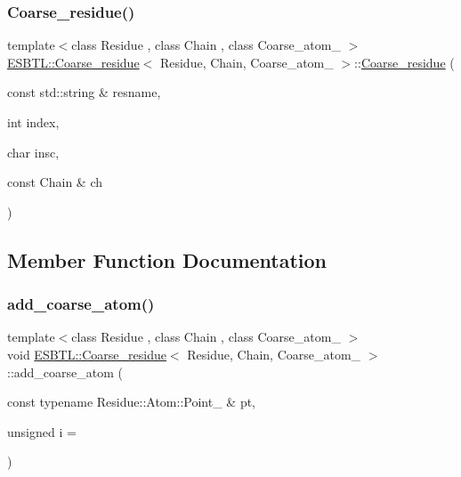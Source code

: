 \mbox{\label{classESBTL_1_1Coarse__residue_abde8049914cf69701dbe59f860887bab}} 
\subsubsection{\texorpdfstring{Coarse\+\_\+residue()}{Coarse\_residue()}\hspace{0.1cm}{\footnotesize\ttfamily [2/2]}}
{\footnotesize\ttfamily template$<$class Residue , class Chain , class Coarse\+\_\+atom\+\_\+ $>$ \\
\hyperlink{classESBTL_1_1Coarse__residue}{E\+S\+B\+T\+L\+::\+Coarse\+\_\+residue}$<$ Residue, Chain, Coarse\+\_\+atom\+\_\+ $>$\+::\hyperlink{classESBTL_1_1Coarse__residue}{Coarse\+\_\+residue} (\begin{DoxyParamCaption}\item[{const std\+::string \&}]{resname,  }\item[{int}]{index,  }\item[{char}]{insc,  }\item[{const Chain \&}]{ch }\end{DoxyParamCaption})\hspace{0.3cm}{\ttfamily [inline]}}



\subsection{Member Function Documentation}
\mbox{\label{classESBTL_1_1Coarse__residue_ac261019b3966c7fd3c921217e335c11e}} 
\subsubsection{\texorpdfstring{add\+\_\+coarse\+\_\+atom()}{add\_coarse\_atom()}}
{\footnotesize\ttfamily template$<$class Residue , class Chain , class Coarse\+\_\+atom\+\_\+ $>$ \\
void \hyperlink{classESBTL_1_1Coarse__residue}{E\+S\+B\+T\+L\+::\+Coarse\+\_\+residue}$<$ Residue, Chain, Coarse\+\_\+atom\+\_\+ $>$\+::add\+\_\+coarse\+\_\+atom (\begin{DoxyParamCaption}\item[{const typename Residue\+::\+Atom\+::\+Point\+\_\+3 \&}]{pt,  }\item[{unsigned}]{i = {} }\end{DoxyParamCaption})\hspace{0.3cm}{\ttfamily [inline]}}

